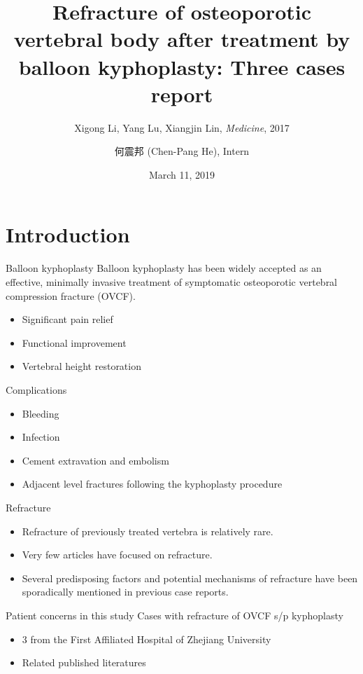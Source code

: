 \documentclass{beamer}
\title[Refeacture of OVCF s/p kyphoplasty]{
    Refracture of osteoporotic vertebral body after treatment by balloon
    kyphoplasty: Three cases report
}
\subtitle{Xigong Li, Yang Lu, Xiangjin Lin, \textit{Medicine}, 2017}
\author[Chen-Pang He]{何震邦 (Chen-Pang He), Intern}
\date{March 11, 2019}
\institute[CGH]{Cathay General Hospital}
\begin{document}
\maketitle

\section{Introduction}
\begin{frame}{Balloon kyphoplasty}
    Balloon kyphoplasty has been widely accepted as an effective, minimally
    invasive treatment of symptomatic osteoporotic vertebral compression
    fracture (OVCF).

    \begin{itemize}
        \item Significant pain relief
        \item Functional improvement
        \item Vertebral height restoration
    \end{itemize}
\end{frame}

\begin{frame}{Complications}
    \begin{itemize}
        \item Bleeding
        \item Infection
        \item Cement extravation and embolism
        \item Adjacent level fractures following the kyphoplasty procedure
    \end{itemize}
\end{frame}

\begin{frame}{Refracture}
    \begin{itemize}
        \item Refracture of previously treated vertebra is relatively rare.
        \item Very few articles have focused on refracture.
        \item Several predisposing factors and potential mechanisms of
              refracture have been sporadically mentioned in previous case
              reports.
    \end{itemize}
\end{frame}

\begin{frame}{Patient concerns in this study}
    Cases with refracture of OVCF s/p kyphoplasty

    \begin{itemize}
        \item 3 from the First Affiliated Hospital of Zhejiang University
        \item Related published literatures
    \end{itemize}
\end{frame}
\end{document}
